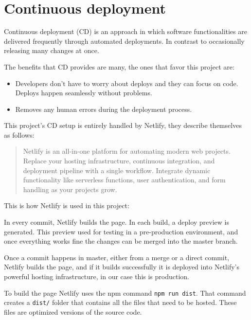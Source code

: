 
\clearpage\newpage\noindent
\section{Continuous deployment}
\label{sec:cd}

Continuous deployment (CD) is an approach in which software functionalities are delivered frequently through automated deployments. In contrast to occasionally releasing many changes at once. 

The benefits that CD provides are many, the ones that favor this project are:
\begin{itemize}[itemsep=0mm]
    \item Developers don't have to worry about deploys and they can focus on code. Deploys happen seamlessly without problems.
    \item Removes any human errors during the deployment process.
\end{itemize}

\noindent
This project's CD setup is entirely handled by Netlify, they describe themselves as follows:
\blockquote{Netlify is an all-in-one platform for automating modern web projects. Replace your hosting infrastructure, continuous integration, and deployment pipeline with a single workflow. Integrate dynamic functionality like serverless functions, user authentication, and form handling as your projects grow. \cite{netlify-docs}}
This is how Netlify is used in this project: 

In every commit, Netlify builds the page. In each build, a deploy preview is generated. This preview used for testing in a pre-production environment, and once everything works fine the changes can be merged into the master branch. 

Once a commit happens in master, either from a merge or a direct commit, Netlify builds the page, and if it builds successfully it is deployed into Netlify's powerful hosting infrastructure, in our case this is production. 

To build the page Netlify uses the npm command \texttt{npm run dist}. That command creates a \texttt{dist/} folder that contains all the files that need to be hosted. These files are optimized versions of the source code.

